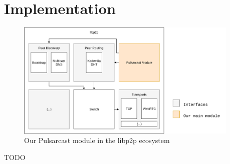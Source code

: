 
\chapter{Implementation}
\label{chapter:implementation}

\begin{figure}[hb!]
  \centering
  \includegraphics[width=0.95\textwidth]{img/pulsarcast-in-libp2p.png}
  \caption{Our Pulsarcast module in the libp2p ecosystem}
  \label{fig:pulsarcast-in-libp2p}
\end{figure}

TODO
